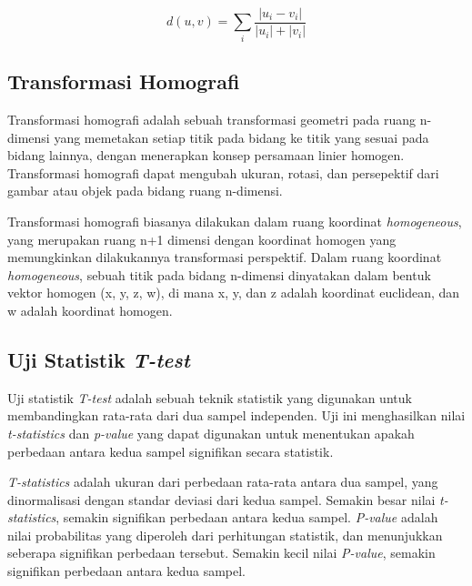 \begin{equation}
	d(u,v) = \sum_i\frac{\left | u_i-v_i \right |}{\left | u_i \right |+\left | v_i \right |}
\end{equation}

\subsection{Transformasi Homografi}
Transformasi homografi adalah sebuah transformasi geometri pada ruang n-dimensi yang memetakan setiap titik pada bidang ke titik yang sesuai pada bidang
lainnya, dengan menerapkan konsep persamaan linier homogen. Transformasi homografi dapat mengubah ukuran, rotasi, dan persepektif dari gambar atau objek pada
bidang ruang n-dimensi.

Transformasi homografi biasanya dilakukan dalam ruang koordinat \emph{homogeneous}, yang merupakan ruang n+1 dimensi dengan koordinat homogen yang memungkinkan
dilakukannya transformasi perspektif. Dalam ruang koordinat \emph{homogeneous}, sebuah titik pada bidang n-dimensi dinyatakan dalam bentuk vektor homogen (x,
y, z, w), di mana x, y, dan z adalah koordinat euclidean, dan w adalah koordinat homogen. 


\subsection{Uji Statistik \emph{T-test}}
Uji statistik \emph{T-test} adalah sebuah teknik statistik yang digunakan untuk membandingkan rata-rata dari dua sampel independen. Uji ini menghasilkan nilai \emph{t-statistics} dan \emph{p-value} yang dapat digunakan untuk menentukan apakah perbedaan antara kedua sampel signifikan secara statistik. \cite{kumar}

\emph{T-statistics} adalah ukuran dari perbedaan rata-rata antara dua sampel, yang dinormalisasi dengan standar deviasi dari kedua sampel. Semakin besar nilai \emph{t-statistics}, semakin signifikan perbedaan antara kedua sampel. \emph{P-value} adalah nilai probabilitas yang diperoleh dari perhitungan statistik, dan menunjukkan seberapa signifikan perbedaan tersebut. Semakin kecil nilai \emph{P-value}, semakin signifikan perbedaan antara kedua sampel. \cite{kumar}

